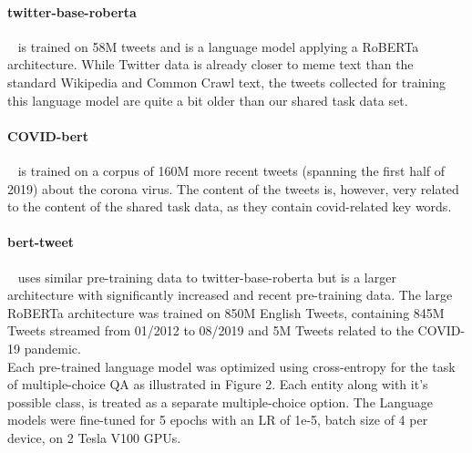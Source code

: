 \documentclass[11pt]{article}
\begin{document}
\paragraph{twitter-base-roberta}~\cite{barbieri2020tweeteval} is trained on 58M tweets and is a language model applying a RoBERTa architecture. While Twitter data is already closer to meme text than the standard Wikipedia and Common Crawl text, the tweets collected for training this language model are quite a bit older than our shared task data set. 

\paragraph{COVID-bert}~\cite{https://doi.org/10.48550/arxiv.2005.07503} is trained on a corpus of 160M more recent tweets (spanning the first half of 2019) about the corona virus. The content of the tweets is, however, very related to the content of the shared task data, as they contain covid-related key words. 

\paragraph{bert-tweet}~\cite{bertweet} uses similar pre-training data to twitter-base-roberta but is a larger architecture with significantly increased and recent pre-training data. The large RoBERTa architecture was trained on  850M English Tweets, containing 845M Tweets streamed from 01/2012 to 08/2019 and 5M Tweets related to the COVID-19 pandemic.\\

Each pre-trained language model was optimized using cross-entropy for the task of multiple-choice QA as illustrated in Figure 2. Each entity along with it's possible class, is treated as a separate multiple-choice option. The Language models were fine-tuned for 5 epochs with an LR of 1e-5, batch size of 4 per device, on 2 Tesla V100 GPUs. 
\end{document}
